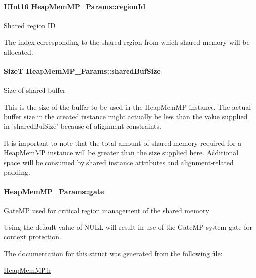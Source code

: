 \paragraph[{region\-Id}]{\setlength{\rightskip}{0pt plus 5cm}U\-Int16 Heap\-Mem\-M\-P\-\_\-\-Params\-::region\-Id}\label{struct_heap_mem_m_p___params_ad1a5b94d015d0b5b75f091ca9be8a04e}
Shared region I\-D \begin{DoxyVerb}   The index corresponding to the shared region from which shared memory
   will be allocated.\end{DoxyVerb}
\paragraph[{shared\-Buf\-Size}]{\setlength{\rightskip}{0pt plus 5cm}Size\-T Heap\-Mem\-M\-P\-\_\-\-Params\-::shared\-Buf\-Size}\label{struct_heap_mem_m_p___params_a7206d2bd65bf705da74310fd004b67bf}
Size of shared buffer

This is the size of the buffer to be used in the Heap\-Mem\-M\-P instance. The actual buffer size in the created instance might actually be less than the value supplied in 'shared\-Buf\-Size' because of alignment constraints.

It is important to note that the total amount of shared memory required for a Heap\-Mem\-M\-P instance will be greater than the size supplied here. Additional space will be consumed by shared instance attributes and alignment-\/related padding. 
\paragraph[{gate}]{ Heap\-Mem\-M\-P\-\_\-\-Params\-::gate}\label{struct_heap_mem_m_p___params_ab07964aed674d108f19482a0d35e4e46}
Gate\-M\-P used for critical region management of the shared memory \begin{DoxyVerb}   Using the default value of NULL will result in use of the GateMP
   system gate for context protection.\end{DoxyVerb}
 

The documentation for this struct was generated from the following file\-:\begin{DoxyCompactItemize}
\item 
\hyperlink{_heap_mem_m_p_8h}{Heap\-Mem\-M\-P.\-h}\end{DoxyCompactItemize}
